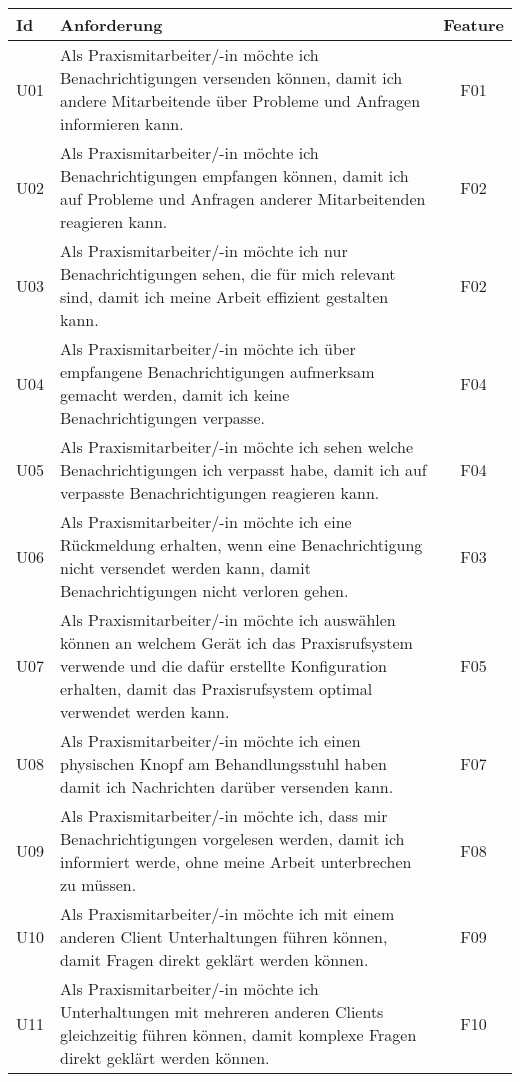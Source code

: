 \begin{table}[h]
    \centering
    \begin{tabular}{|l|p{13cm}|c|}
        \hline
        \textbf{Id} & \textbf{Anforderung}                                                                                                                                                                                         & \textbf{Feature} \\
        \hline
        U01         & Als Praxismitarbeiter/-in möchte ich Benachrichtigungen versenden können, damit ich andere Mitarbeitende über Probleme und Anfragen informieren kann. & F01 \\
        \hline
        U02         & Als Praxismitarbeiter/-in möchte ich Benachrichtigungen empfangen können, damit ich auf Probleme und Anfragen anderer Mitarbeitenden reagieren kann. & F02 \\
        \hline
        U03         & Als Praxismitarbeiter/-in möchte ich nur Benachrichtigungen sehen, die für mich relevant sind, damit ich meine Arbeit effizient gestalten kann. & F02 \\
        \hline
        U04         & Als Praxismitarbeiter/-in möchte ich über empfangene Benachrichtigungen aufmerksam gemacht werden, damit ich keine Benachrichtigungen verpasse. & F04 \\
        \hline
        U05         & Als Praxismitarbeiter/-in möchte ich sehen welche Benachrichtigungen ich verpasst habe, damit ich auf verpasste Benachrichtigungen reagieren kann. & F04 \\
        \hline
        U06         & Als Praxismitarbeiter/-in möchte ich eine Rückmeldung erhalten, wenn eine Benachrichtigung nicht versendet werden kann, damit Benachrichtigungen nicht verloren gehen. & F03 \\
        \hline
        U07         & Als Praxismitarbeiter/-in möchte ich auswählen können an welchem Gerät ich das Praxisrufsystem verwende und die dafür erstellte Konfiguration erhalten, damit das Praxisrufsystem optimal verwendet werden kann. & F05 \\
        \hline
        U08          & Als Praxismitarbeiter/-in möchte ich einen physischen Knopf am Behandlungsstuhl haben damit ich Nachrichten darüber versenden kann. & F07 \\
        \hline
        U09          & Als Praxismitarbeiter/-in möchte ich, dass mir Benachrichtigungen vorgelesen werden, damit ich informiert werde, ohne meine Arbeit unterbrechen zu müssen. & F08 \\
        \hline
        U10         & Als Praxismitarbeiter/-in möchte ich mit einem anderen Client Unterhaltungen führen können, damit Fragen direkt geklärt werden können. & F09 \\
        \hline
        U11         & Als Praxismitarbeiter/-in möchte ich Unterhaltungen mit mehreren anderen Clients gleichzeitig führen können, damit komplexe Fragen direkt geklärt werden können. & F10 \\
        \hline
    \end{tabular}\label{tab:userstories1}
\end{table}

